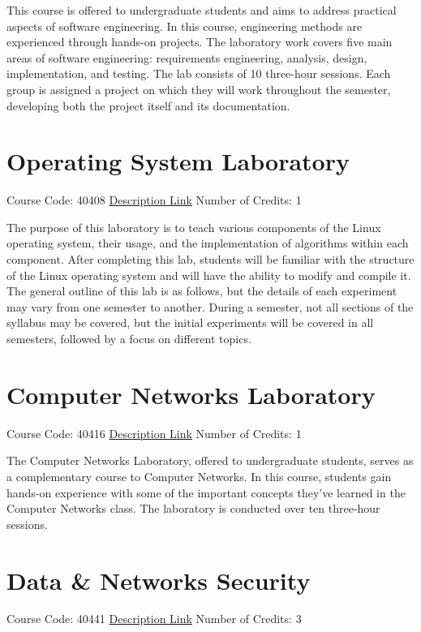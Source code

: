 \documentclass[
fontsize=11pt,
paper=a4,
parskip=half,
enlargefirstpage=off,    %
fromalign=right,        %
fromphone=on,           %
fromemail=on,
fromrule=off,           %
addrfield=off,          %
backaddress=on,         %
subject=beforeopening,  %
locfield=narrow,        %
foldmarks=off,          %
open=any
]{scrartcl}
\begin{document}
This course is offered to undergraduate students and aims to address practical aspects of software engineering. In this course, engineering methods are experienced through hands-on projects. The laboratory work covers five main areas of software engineering: requirements engineering, analysis, design, implementation, and testing. The lab consists of 10 three-hour sessions. Each group is assigned a project on which they will work throughout the semester, developing both the project itself and its documentation.

\section{Operating System Laboratory}
Course Code: 40408 \qquad \quad \href{https://docs.ce.sharif.edu/course/40408}{Description Link}
\qquad \quad Number of Credits: 1

The purpose of this laboratory is to teach various components of the Linux operating system, their usage, and the implementation of algorithms within each component. After completing this lab, students will be familiar with the structure of the Linux operating system and will have the ability to modify and compile it. The general outline of this lab is as follows, but the details of each experiment may vary from one semester to another. During a semester, not all sections of the syllabus may be covered, but the initial experiments will be covered in all semesters, followed by a focus on different topics.


\section{Computer Networks Laboratory}
Course Code: 40416 \qquad \quad \href{https://docs.ce.sharif.edu/course/40416}{Description Link}
\qquad \quad Number of Credits: 1

The Computer Networks Laboratory, offered to undergraduate students, serves as a complementary course to Computer Networks. In this course, students gain hands-on experience with some of the important concepts they've learned in the Computer Networks class. The laboratory is conducted over ten three-hour sessions.

\section{Data \& Networks Security}
Course Code: 40441 \qquad \quad \href{https://docs.ce.sharif.edu/course/40441}{Description Link}
\qquad \quad Number of Credits: 3
\end{document}
